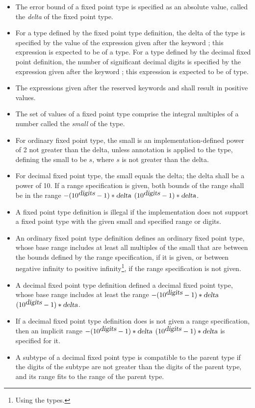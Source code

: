 \begin{itemize}
  \item[] The error bound of a fixed point type is specified as an absolute value, called the {\em delta} of the fixed point type. 
  \item[] For a type defined by the fixed point type definition, the delta of the type is specified by the value of the expression given after the keyword ; this expression is expected to be of a  type. For a type defined by the decimal fixed point definition, the number of significant decimal digits is specified by the expression given after the keyword ; this expression is expected to be of  type. 
  \item[] The expressions given after the reserved keywords  and  shall result in positive values. 
  \item[] The set of values of a fixed point type comprise the integral multiples of a number called the {\em small} of the type. 
  \item[] For ordinary fixed point type, the small is an implementation-defined power of 2 not greater than the delta, unless annotation  is applied to the type, defining the small to be $s$, where $s$ is not greater than the delta. 
  \item[] For decimal fixed point type, the small equals the delta; the delta shall be a power of 10. If a range specification is given, both bounds of the range shall be in the range $-(10^{\mbox{\sl digits}}-1)*\mbox{\sl delta}$  $(10^{\mbox{\sl digits}}-1)*\mbox{\sl delta}$. 
  \item[] A fixed point type definition is illegal if the implementation does not support a fixed point type with the given small and specified range or digits. 
  \item[] An ordinary fixed point type definition defines an ordinary fixed point type, whose base range includes at least all multiples of the small that are between the bounds defined by the range specification, if it is given, or between negative infinity to positive infinity\footnote{Using the  types.}, if the range specification is not given.
  \item[] A decimal fixed point type definition defined a decimal fixed point type, whose base range includes at least the range $-(10^{\mbox{\sl digits}}-1)*\mbox{\sl delta}$  $(10^{\mbox{\sl digits}}-1)*\mbox{\sl delta}$. 
  \item[] If a decimal fixed point type definition does is not given a range specification, then an implicit range $-(10^{\mbox{\sl digits}}-1)*\mbox{\sl delta}$  $(10^{\mbox{\sl digits}}-1)*\mbox{\sl delta}$ is specified for it. 
  \item[] A subtype of a decimal fixed point type is compatible to the parent type if the digits of the subtype are not greater than the digits of the parent type, and its range fits to the range of the parent type. 
\end{itemize}

